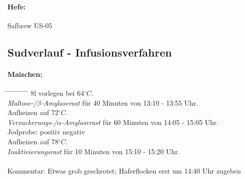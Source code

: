 \documentclass[12pt,oneside,a4paper]{scrartcl}
\begin{document}
\paragraph{Hefe:}
	{\color{green}Safbrew US-05}
%
\subsection*{Sudverlauf - Infusionsverfahren}	
%
\paragraph{Maischen:}
	\begin{tabbing}\hspace{1cm} \=
		\hspace{1cm} \= \hspace{1cm} \=\hspace{1cm} \=\hspace{1cm} \=\hspace{1cm} \= \hspace{1cm} \= \hspace{1cm} \= \hspace{1cm} \= \hspace{1cm} \= \kill
		\> {\color{green}8}l vorlegen bei {\color{green}64}$^\circ C$.\\
		\> \textit{Maltose-/$\beta$-Amylaserast} für {\color{green}40} Minuten von {\color{red}13:10} - {\color{red}13:55} Uhr.\\
		\> \> Aufheizen auf 72$^\circ C$.\\
		\> \textit{Verzuckerungs-/$\alpha$-Amylaserast} für {\color{green}60} Minuten von {\color{red}14:05} - {\color{green}15:05} Uhr.\\
		\> \> \> Jodprobe: \> \> {\color{green}\Square} positiv \> \> {\color{green}\CheckedBox} negativ\\
		\> \> Aufheizen auf 78$^\circ C$.\\
		\> \textit{Inaktivierungsrast} für {\color{green}10} Minuten von {\color{red}15:10} - {\color{green}15:20} Uhr.\\\\
		\> Kommentar: \>\>\> {\color{green}Etwas grob geschrotet; Haferflocken erst um 14:40 Uhr zugeben}
	\end{tabbing}
\end{document}
